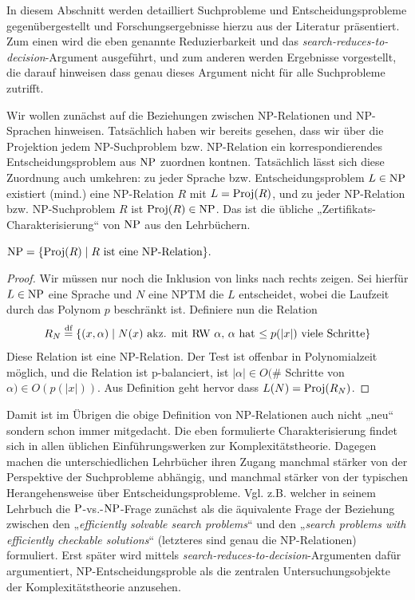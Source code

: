 In diesem Abschnitt werden detailliert Suchprobleme und Entscheidungsprobleme gegenübergestellt und Forschungsergebnisse hierzu aus der Literatur präsentiert.
Zum einen wird die eben genannte Reduzierbarkeit und das \emph{search-reduces-to-decision}-Argument ausgeführt, und zum anderen werden Ergebnisse vorgestellt, die darauf hinweisen dass genau dieses Argument nicht für alle Suchprobleme zutrifft.

Wir wollen zunächst auf die Beziehungen zwischen NP-Relationen und NP-Sprachen hinweisen.
Tatsächlich haben wir bereits gesehen, dass wir über die Projektion jedem NP-Suchproblem bzw. NP-Relation ein korrespondierendes Entscheidungsproblem aus $\NP$ zuordnen kontnen. Tatsächlich lässt sich diese Zuordnung auch umkehren: zu jeder Sprache bzw. Entscheidungsproblem $L\in \NP$ existiert (mind.) eine NP-Relation $R$ mit $L=\Proj(R)$, und zu jeder NP-Relation bzw. NP-Suchproblem $R$ ist $\Proj(R)\in\NP$. Das ist die übliche „Zertifikats-Charakterisierung“ von $\NP$ aus den Lehrbüchern.
\begin{observation}\label{obs:np-certificate-def}
    $\NP = \{ \Proj(R) \mid \text{$R$ ist eine NP-Relation} \}.$
\end{observation}
\begin{proof}
    Wir müssen nur noch die Inklusion von links nach rechts zeigen. Sei hierfür $L\in\NP$ eine Sprache und $N$ eine NPTM die $L$ entscheidet, wobei die Laufzeit durch das Polynom $p$ beschränkt ist. Definiere nun die Relation
    \[ R_N  \defeq \{ (x, \alpha) \mid \text{$N(x)$ akz. mit RW $\alpha$, $\alpha$ hat $\leq p(|x|)$ viele Schritte} \} \]
    Diese Relation ist eine NP-Relation. Der Test ist offenbar in Polynomialzeit möglich, und die Relation ist p-balanciert, ist $|\alpha|\in O($\# Schritte von $\alpha)\in O(p(|x|))$.
    Aus Definition geht hervor dass $L(N) = \Proj(R_N)$.
\end{proof}
Damit ist im Übrigen die obige Definition von NP-Relationen auch nicht „neu“ sondern schon immer mitgedacht. Die eben formulierte Charakterisierung findet sich in allen üblichen Einführungswerken zur Komplexitätstheorie. Dagegen machen die unterschiedlichen Lehrbücher ihren Zugang manchmal stärker von der Perspektive der Suchprobleme abhängig, und manchmal stärker von der typischen Herangehensweise über Entscheidungsprobleme.
Vgl. z.B. \textcite{goldreich_computational_2008} welcher in seinem Lehrbuch die $\P$-vs.-$\NP$-Frage zunächst als die äquivalente Frage der Beziehung zwischen den „\emph{efficiently solvable search problems}“ und den „\emph{search problems with efficiently checkable solutions}“ (letzteres sind genau die NP-Relationen) formuliert. Erst später wird mittels \emph{search-reduces-to-decision}-Argumenten dafür argumentiert, NP-Entscheidungsproble als die zentralen Untersuchungsobjekte der Komplexitätstheorie anzusehen.

